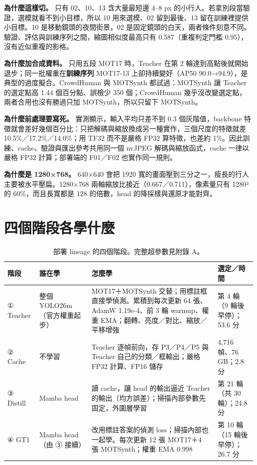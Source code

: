 \documentclass[UTF8,11pt,a4paper,fontset=none]{ctexart}
\begin{document}
\textbf{為什麼這樣切。} 只有 02、10、13 含大量最短邊 4--8 px 的小行人。若拿別段當驗證，選模就看不到小目標，所以 10 用來選模、02 留到最後、13 留在訓練裡提供小目標。10 是移動鏡頭的夜間街景，02 是固定鏡頭的白天，兩者條件刻意不同。驗證、評估與訓練序列之間，縮圖相似度最高只有 0.587（重複判定門檻 0.95），沒有近似重複的影格。\cite{t01}

\textbf{為什麼加合成資料。} 只用五段 MOT17 時，Teacher 在第 2 輪達到高點後就開始退步；同一批權重在\textbf{訓練序列} MOT17-13 上卻持續變好（AP50 90.0→94.9），是典型的過度擬合。CrowdHuman 與 MOTSynth 都試過：MOTSynth 讓 Teacher 的選定點高 1.44 個百分點、誤檢少 350 個；CrowdHuman 幾乎沒改變選定點，兩者合用也沒有勝過只加 MOTSynth，所以只留下 MOTSynth。\cite{hrtrain}

\textbf{為什麼前處理要寫死。} 實測顯示，輸入平均只差不到 0.3 個灰階值，backbone 特徵就會差好幾個百分比：只把解碼與縮放換成另一種實作，三個尺度的特徵就差 10.5\%／17.2\%／14.0\%；用 TF32 而不是嚴格 FP32 算特徵，也差約 1\%。因此訓練、cache、驗證與匯出參考共用同一個 nvJPEG 解碼與縮放函式，cache 一律以嚴格 FP32 計算；部署端的 F01／F02 也實作同一規則。\cite{t01}

\textbf{為什麼是 1280×768。} 640×640 會把 1920 寬的畫面壓到三分之一，瘦長的行人主要被水平壓扁。1280×768 兩軸縮放比接近（0.667／0.711），像素量只有 1280² 的 60\%，而且長寬都是 128 的倍數，head 的降採樣與還原才能對齊。\cite{hrtrain}

\clearpage
\section{四個階段各學什麼}
\begin{table}[H]
\small
\begin{tabularx}{\textwidth}{@{}P{1.55cm} P{2.3cm} Y P{2.5cm}@{}}
\toprule
階段 & 誰在學 & 怎麼學 & 選定／時間 \\
\midrule
① Teacher & 整個 YOLO26m（官方權重起步） & MOT17＋MOTSynth 交替；用標註框直接學偵測。累積到每次更新 64 張、AdamW 1.19e-4、前 3 輪 warmup、權重 EMA；翻轉、亮度／對比、縮放／平移增強 & 第 4 輪（9 輪後早停）；53.6 分 \\
② Cache & 不學習 & Teacher 逐幀前向，存 P3／P4／P5 與 Teacher 自己的分類／框輸出；嚴格 FP32 計算、FP16 儲存 & 4,716 幀、76 GB；2.8 分 \\
③ Distill & Mamba head & 讀 cache，讓 head 的輸出逼近 Teacher 的輸出（均方誤差）；掃描內部參數先固定，外圍層學習 & 第 21 輪（共 30 輪）；24.8 分 \\
④ GT1 & Mamba head（由 ③ 接續） & 改用標註答案的偵測 loss；掃描內部也一起學。每次更新 12 張 MOT17＋4 張 MOTSynth；權重 EMA 0.998 & 第 10 輪（15 輪後早停）；26.7 分 \\
\bottomrule
\end{tabularx}
\caption{部署 lineage 的四個階段。完整超參數見附錄 A。}
\end{table}
\end{document}
